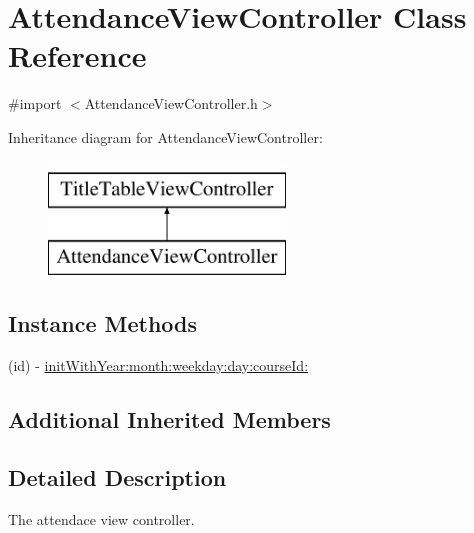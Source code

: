\hypertarget{interface_attendance_view_controller}{\section{Attendance\+View\+Controller Class Reference}
\label{interface_attendance_view_controller}
}


{\ttfamily \#import $<$Attendance\+View\+Controller.\+h$>$}

Inheritance diagram for Attendance\+View\+Controller\+:\begin{figure}[H]
\begin{center}
\leavevmode
\includegraphics[height=3.000000cm]{interface_attendance_view_controller}
\end{center}
\end{figure}
\subsection*{Instance Methods}
\begin{DoxyCompactItemize}
\item 
(id) -\/ \hyperlink{interface_attendance_view_controller_af8b1b06a44d046d768a3091ce56b93dd}{init\+With\+Year\+:month\+:weekday\+:day\+:course\+Id\+:}
\end{DoxyCompactItemize}
\subsection*{Additional Inherited Members}


\subsection{Detailed Description}
The attendace view controller. 

